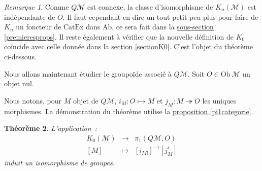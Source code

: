\documentclass{amsart}
\newcommand{\sref}[2]{\hyperref[#2]{#1 \ref*{#2}}}
\theoremstyle{plain}
\newtheorem{theo}{Théorème}[section]
\theoremstyle{definition}
\theoremstyle{remark}
\newtheorem{rem}[theo]{Remarque}
\newcommand{\M}{\mathcal{M}}
\newcommand{\Ob}[1]{\mathrm{Ob}\:#1}
\newcommand{\CatEx}{\mathrm{CatEx}}
\newcommand{\Ab}{\mathrm{Ab}}
\newcommand{\ra}{\rightarrow}
\begin{document}
\begin{rem}
  Comme $Q\M$ est connexe, la classe d'isomorphisme de $K_n(\M)$ est indépendante de $O$. Il faut cependant en dire un tout petit peu plus
  pour faire de $K_n$ un foncteur de $\CatEx$ dans $\Ab$, ce sera fait dans la \sref{sous-section}{premieresprops}.
  Il reste également à vérifier que la nouvelle définition de $K_0$ coïncide avec celle donnée dans la \sref{section}{sectionK0}. C'est l'objet
  du théorème ci-dessous.
\end{rem}

Nous allons maintenant étudier le groupoïde associé à $Q\M$. Soit $O\in \Ob\M$ un objet nul.

Nous notons, pour $M$ objet de $Q\M$, $i_M:O\rightarrowtail M$ et $j_M:M\twoheadrightarrow O$ les uniques morphismes.
La démonstration du théorème utilise la \sref{proposition}{pi1categorie}.
\begin{theo}
  L'application~:
  $$
  \begin{array}{lcl}
    K_0(\M) &\ra     & \pi_1(Q\M,O) \\
    {[{M}]}     &\mapsto & [i_{M!}]^{-1}[j_M^!]
  \end{array}
  $$
  induit un isomorphisme de groupes.
\end{theo}
\end{document}
